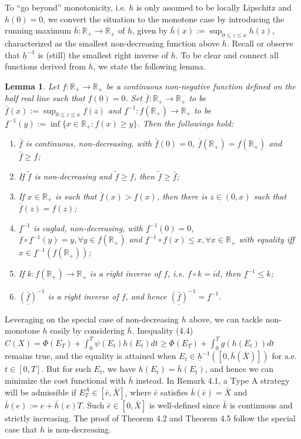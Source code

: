 \documentclass[openany,oneside]{article}
\newtheorem{lem}[thm]{Lemma}
\theoremstyle{definition}
\theoremstyle{remark}
\begin{document}
To ``go beyond'' monotonicity, i.e. $h$ is only assumed to be locally Lipschitz and $h(0)=0$, we convert the situation to the monotone case by introducing the running maximum $\bar{h}:\mathbb{R}_+ \to \mathbb{R}_+$ of $h$, given by $\bar{h}(x) := \sup_{0\le z\le x} h(z)$, characterized as the smallest non-decreasing function above $h$. Recall or observe that $\underline{h}^{-1}$ is (still) the smallest right inverse of $h$. To be clear and connect all functions derived from $h$, we state the following lemma.
\begin{lem}
Let $f:\mathbb{R}_+ \to \mathbb{R}_+$ be a continuous non-negative function defined on the half real line such that $f(0)=0$. Set $\bar{f}:\mathbb{R}_+ \to \mathbb{R}_+$ to be $\bar{f}(x) := \sup_{0\le z\le x} f(z)$ and $\underline{f}^{-1}:f(\mathbb{R}_+) \to \mathbb{R}_+$ to be $\underline{f}^{-1}(y) := \inf\{x\in\mathbb{R_+} : f(x) \ge y\}$. Then the followings hold:
\begin{enumerate}
\item $\bar{f}$ is continuous, non-decreasing, with $\bar{f}(0)=0$, $\bar{f}(\mathbb{R}_+)  = f(\mathbb{R}_+)$ and $\bar{f} \ge f$;
\item If $\tilde{f}$ is non-decreasing and $\tilde{f} \ge f$, then $\tilde{f} \ge \bar{f}$;
\item If $x\in \mathbb{R}_+$ is such that $\bar{f}(x) > f(x)$, then there is $z\in(0,x)$ such that $\bar{f}(z) = f(z)$;
\item $\underline{f}^{-1}$ is caglad, non-decreasing, with $\underline{f}^{-1}(0)=0$, $f\circ \underline{f}^{-1}(y) = y, \forall y\in f(\mathbb{R}_+)$ and $\underline{f}^{-1} \circ f (x) \le x, \forall x\in \mathbb{R}_+$ with equality iff $x\in \underline{f}^{-1}(f(\mathbb{R}_+))$;
\item If $k:f(\mathbb{R}_+) \to \mathbb{R}_+$ is a right inverse of $f$, i.e. $f\circ k = id$, then $\underline{f}^{-1} \le k$;
\item $\underline{\left(\bar{f}\right)}^{-1}$ is a right inverse of $f$, and hence $\underline{\left(\bar{f}\right)}^{-1} = \underline{f}^{-1}$.
\end{enumerate}
\end{lem}

Leveraging on the special case of non-decreasing $h$ above, we can tackle non-monotone $h$ easily by considering $\bar{h}$. Inequality (4.4) $C(X) = \Phi(E_T) + \int_0^T \psi(E_t) h(E_t) dt \ge \Phi(E_T) + \int_0^T g(h(E_t)) dt$ remains true, and the equality is attained when $E_t \in \underline{h}^{-1}([0,\bar{h}(\bar{X})])$ for a.e. $t\in[0,T]$. But for such $E_t$, we have $h(E_t) = \bar{h}(E_t)$, and hence we can minimize the cost functional with $\bar{h}$ instead. In Remark 4.1, a Type A strategy will be admissible if $E^A_T \in[\bar{e},\bar{X}]$, where $\bar{e}$ satisfies $\bar{k}(\bar{e}) = \bar{X}$ and $\bar{k}(e) := e + \bar{h}(e) T$. Such $\bar{e} \in [0,\bar{X}]$ is well-defined since $\bar{k}$ is continuous and strictly increasing. The proof of Theorem 4.2 and Theorem 4.5 follow the special case that $h$ is non-decreasing.
\end{document}
